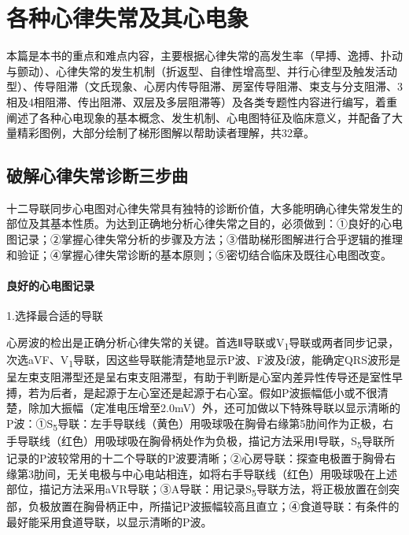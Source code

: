 \part{各种心律失常及其心电象}

本篇是本书的重点和难点内容，主要根据心律失常的高发生率（早搏、逸搏、扑动与颤动）、心律失常的发生机制（折返型、自律性增高型、并行心律型及触发活动型）、传导阻滞（文氏现象、心房内传导阻滞、房室传导阻滞、束支与分支阻滞、3相及4相阻滞、传出阻滞、双层及多层阻滞等）及各类专题性内容进行编写，着重阐述了各种心电现象的基本概念、发生机制、心电图特征及临床意义，并配备了大量精彩图例，大部分绘制了梯形图解以帮助读者理解，共32章。

\protect\hypertarget{text00016.html}{}{}

\protect\hypertarget{text00016.htmlux5cux23chapter16}{}{}

\chapter{破解心律失常诊断三步曲}

十二导联同步心电图对心律失常具有独特的诊断价值，大多能明确心律失常发生的部位及其基本性质。为达到正确地分析心律失常之目的，必须做到：①良好的心电图记录；②掌握心律失常分析的步骤及方法；③借助梯形图解进行合乎逻辑的推理和验证；④掌握心律失常诊断的基本原则；⑤密切结合临床及既往心电图改变。

\protect\hypertarget{text00016.htmlux5cux23subid116}{}{}

\subsection{良好的心电图记录}

1.选择最合适的导联

心房波的检出是正确分析心律失常的关键。首选Ⅱ导联或V\textsubscript{1}导联或两者同步记录，次选aVF、V\textsubscript{1}导联，因这些导联能清楚地显示P波、F波及f波，能确定QRS波形是呈左束支阻滞型还是呈右束支阻滞型，有助于判断是心室内差异性传导还是室性早搏，若为后者，是起源于左心室还是起源于右心室。假如P波振幅低小或不很清楚，除加大振幅（定准电压增至2.0mV）外，还可加做以下特殊导联以显示清晰的P波：①S\textsubscript{5}导联：左手导联线（黄色）用吸球吸在胸骨右缘第5肋间作为正极，右手导联线（红色）用吸球吸在胸骨柄处作为负极，描记方法采用Ⅰ导联，S\textsubscript{5}导联所记录的P波较常用的十二个导联的P波要清晰；②心房导联：探查电极置于胸骨右缘第3肋间，无关电极与中心电站相连，如将右手导联线（红色）用吸球吸在上述部位，描记方法采用aVR导联；③A导联：用记录S\textsubscript{5}导联方法，将正极放置在剑突部，负极放置在胸骨柄正中，所描记P波振幅较高且直立；④食道导联：有条件的最好能采用食道导联，以显示清晰的P波。

